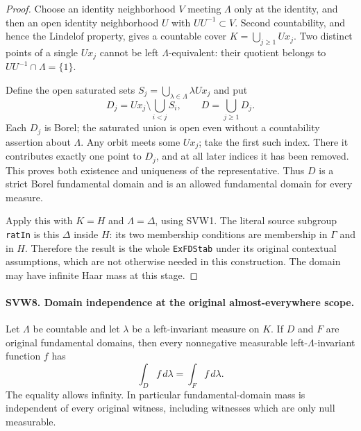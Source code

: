 \begin{proof}
Choose an identity neighborhood $V$ meeting $\Lambda$ only at the
identity, and then an open identity neighborhood $U$ with
$UU^{-1}\subset V$.  Second countability, and hence the Lindelof
property, gives a countable cover $K=\bigcup_{j\geq1}Ux_j$.
Two distinct points of a single $Ux_j$ cannot be left
$\Lambda$-equivalent: their quotient belongs to $UU^{-1}\cap
\Lambda=\{1\}$.

Define the open saturated sets
$S_j=\bigcup_{\lambda\in\Lambda}\lambda Ux_j$ and put
\[
 D_j=Ux_j\setminus\bigcup_{i<j}S_i,
                    \qquad D=\bigcup_{j\geq1}D_j.
 \tag{SVW.14}
\]
Each $D_j$ is Borel; the saturated union is open even without a
countability assertion about $\Lambda$.  Any orbit meets some
$Ux_j$; take the first such index.  There it contributes exactly
one point to $D_j$, and at all later indices it has been removed.
This proves both existence and uniqueness of the representative.
Thus $D$ is a strict Borel fundamental domain and is an allowed
fundamental domain for every measure.

Apply this with $K=H$ and $\Lambda=\Delta$, using SVW1.
The literal source subgroup \texttt{ratIn} is this $\Delta$ inside
$H$: its two membership conditions are membership in $\Gamma$
and in $H$.  Therefore the result is the whole \texttt{ExFDStab}
under its original contextual assumptions, which are not otherwise
needed in this construction.  The domain may have infinite Haar
mass at this stage.
\end{proof}

\paragraph{SVW8. Domain independence at the original almost-everywhere scope.}
\label{claim:SVW8}
Let $\Lambda$ be countable and let $\lambda$ be a left-invariant
measure on $K$.  If $D$ and $F$ are original fundamental domains,
then every nonnegative measurable left-$\Lambda$-invariant function
$f$ has
\[
                     \int_D f\,d\lambda=\int_F f\,d\lambda.
 \tag{SVW.15}
\]
The equality allows infinity.  In particular fundamental-domain
mass is independent of every original witness, including witnesses
which are only null measurable.

